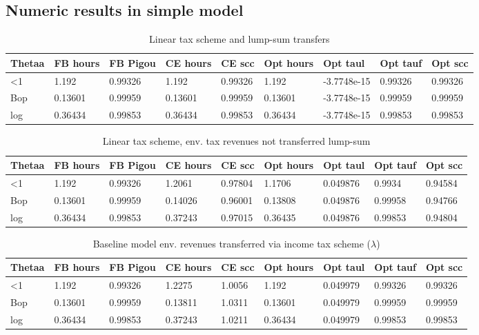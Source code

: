 \subsection{Numeric results in simple model}
\begin{table}[h!!]
	\caption{Linear tax scheme and lump-sum transfers}\label{tab:lin_lst}
	\begin{tabular}{lllllllll}
		Thetaa & FB hours & FB Pigou & CE hours & CE scc & Opt hours & Opt taul & Opt tauf & Opt scc \\ 
		\hline 
		<1 & 1.192 & 0.99326 & 1.192 & 0.99326 & 1.192 & -3.7748e-15 & 0.99326 & 0.99326 \\ 
		Bop & 0.13601 & 0.99959 & 0.13601 & 0.99959 & 0.13601 & -3.7748e-15 & 0.99959 & 0.99959 \\ 
		log & 0.36434 & 0.99853 & 0.36434 & 0.99853 & 0.36434 & -3.7748e-15 & 0.99853 & 0.99853 \\ 
		\hline 
	\end{tabular}
\end{table}
\begin{table}
	\caption{Linear tax scheme, env. tax revenues not transferred lump-sum}\label{tab:lin_nolst}
	\begin{tabular}{lllllllll}
		Thetaa & FB hours & FB Pigou & CE hours & CE scc & Opt hours & Opt taul & Opt tauf & Opt scc \\ 
		\hline 
		<1 & 1.192 & 0.99326 & 1.2061 & 0.97804 & 1.1706 & 0.049876 & 0.9934 & 0.94584 \\ 
		Bop & 0.13601 & 0.99959 & 0.14026 & 0.96001 & 0.13808 & 0.049876 & 0.99958 & 0.94766 \\ 
		log & 0.36434 & 0.99853 & 0.37243 & 0.97015 & 0.36435 & 0.049876 & 0.99853 & 0.94804 \\ 
		\hline 
	\end{tabular}
\end{table}
\begin{table}[h!!]
	\caption{Baseline model env. revenues transferred via income tax scheme ($\lambda$)}\label{tab:base}
	\begin{tabular}{lllllllll}
		Thetaa & FB hours & FB Pigou & CE hours & CE scc & Opt hours & Opt taul & Opt tauf & Opt scc \\ 
		\hline 
		<1 & 1.192 & 0.99326 & 1.2275 & 1.0056 & 1.192 & 0.049979 & 0.99326 & 0.99326 \\ 
		Bop & 0.13601 & 0.99959 & 0.13811 & 1.0311 & 0.13601 & 0.049979 & 0.99959 & 0.99959 \\ 
		log & 0.36434 & 0.99853 & 0.37243 & 1.0211 & 0.36434 & 0.049979 & 0.99853 & 0.99853 \\ 
		\hline 
	\end{tabular}
\end{table}




